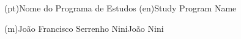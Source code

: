 \ntdegreename*(pt){Nome do Programa de Estudos}
\ntdegreename*(en){Study Program Name}




\ntauthorname(m){João Francisco Serrenho Nini}{João Nini}

